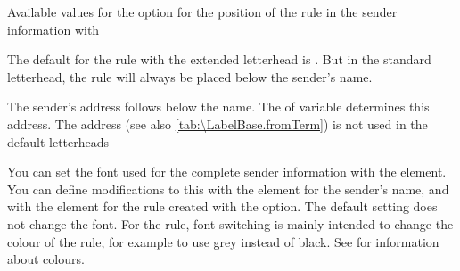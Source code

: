 \begin{table}
  \caption[{Available values for the  option with
    }]{Available values for the  option for the
    position of the rule in the sender information with
    }
  \label{tab:\LabelBase.fromrule}
  \begin{desctabular}
  \end{desctabular}
\end{table}

The default for the rule with the extended letterhead is
. But in the standard letterhead, the rule will always be placed
below the sender's name.

The sender's address follows below the name.
The  of variable  determines this
address. The address  (see also
\autoref{tab:\LabelBase.fromTerm}) is not used in the default letterheads

\BeginIndexGroup
{}%
%
%
You can set the font used for the complete sender information with the
%
 element. You can define modifications to
this with the %
 element for the sender's name, and with the
%
 element for the rule created with the
 option. The default setting does not change the font. For
the rule, font switching is mainly intended to change the colour of the rule,
for example to use grey instead of black. See \cite{package:xcolor} for
information about colours.%
%
\EndIndexGroup

